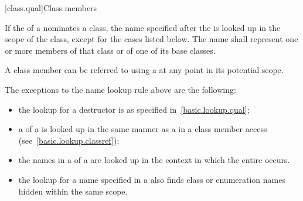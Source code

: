 [class.qual]{Class members}

\pnum
{}%
If the  of a 
nominates a class, the name specified after the
 is looked up in the scope of the
class, except for the cases listed below.
The name shall represent one or more members of that class or of one of
its base classes. \begin{note} A class member
can be referred to using a  at any point in its
potential scope. \end{note} The exceptions to
the name lookup rule above are the following:
\begin{itemize}
\item the lookup for a destructor is as specified
in~\ref{basic.lookup.qual};

\item a  of a
 is looked up
in the same manner as a  in a class member
access (see~\ref{basic.lookup.classref});

\item the names in a  of a
 are looked up in the context in which the entire
 occurs.

\item the lookup for a name specified in a
 also finds class or
enumeration names hidden within the same
scope.
\end{itemize}

